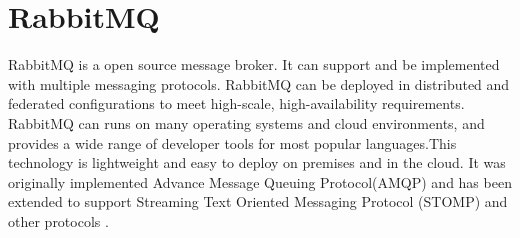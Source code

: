 \section{RabbitMQ}
RabbitMQ is a open source message broker. It can support and be implemented with multiple messaging protocols. RabbitMQ can be deployed in distributed and federated configurations to meet high-scale, high-availability requirements. RabbitMQ can runs on many operating systems and cloud environments, and provides a wide range of developer tools for most popular languages.This technology is lightweight and easy to deploy on premises and in the cloud.\cite{RabbitMQ}
It was originally implemented Advance Message Queuing Protocol(AMQP) and has been extended to support Streaming Text Oriented Messaging Protocol (STOMP) and other protocols \cite{RabbitMQ-wiki}.
